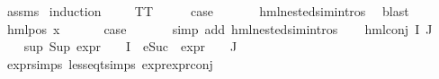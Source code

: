 \begin{isabellebody}
%
\isadelimproof
%
\endisadelimproof
%
\isatagproof
{}\isamarkupfalse%
\ assms\isanewline
{}\isamarkupfalse%
\ {\isacharparenleft}{\kern0pt}induction\ {\isasymphi}{\isacharparenright}{\kern0pt}\isanewline
\ \ \isamarkupfalse%
\ TT\isanewline
\ \ \isamarkupfalse%
\ \isamarkupfalse%
\ {\isacharquery}{\kern0pt}case\ \isanewline
\ \ \ \ \isamarkupfalse%
\ hml{\isacharunderscore}{\kern0pt}{}{\isacharunderscore}{\kern0pt}nested{\isacharunderscore}{\kern0pt}sim{\isachardot}{\kern0pt}intros{\isacharparenleft}{\kern0pt}{}{\isacharparenright}{\kern0pt}\ \isamarkupfalse%
\ blast\isanewline
{}\isamarkupfalse%
\isanewline
\ \ \isamarkupfalse%
\ {\isacharparenleft}{\kern0pt}hml{\isacharunderscore}{\kern0pt}pos\ x{}\ {\isasymphi}{\isacharparenright}{\kern0pt}\isanewline
\ \ \isamarkupfalse%
\ \isamarkupfalse%
\ {\isacharquery}{\kern0pt}case\ \isanewline
\ \ \ \ \isamarkupfalse%
\ {\isacharparenleft}{\kern0pt}simp\ add{\isacharcolon}{\kern0pt}\ hml{\isacharunderscore}{\kern0pt}{}{\isacharunderscore}{\kern0pt}nested{\isacharunderscore}{\kern0pt}sim{\isachardot}{\kern0pt}intros{\isacharparenleft}{\kern0pt}{}{\isacharparenright}{\kern0pt}{\isacharparenright}{\kern0pt}\isanewline
{}\isamarkupfalse%
\isanewline
\ \ \isamarkupfalse%
\ {\isacharparenleft}{\kern0pt}hml{\isacharunderscore}{\kern0pt}conj\ I\ J\ {\isasymPhi}{\isacharparenright}{\kern0pt}\isanewline
\ \ \isamarkupfalse%
\ sup{\isacharcolon}{\kern0pt}\ {\isachardoublequoteopen}{\isacharparenleft}{\kern0pt}Sup\ {\isacharparenleft}{\kern0pt}{\isacharparenleft}{\kern0pt}expr{\isacharunderscore}{\kern0pt}{}\ {\isasymcirc}\ {\isasymPhi}{\isacharparenright}{\kern0pt}\ {\isacharbackquote}{\kern0pt}\ I\ {\isasymunion}\ {\isacharparenleft}{\kern0pt}{\isacharparenleft}{\kern0pt}eSuc\ {\isasymcirc}\ expr{\isacharunderscore}{\kern0pt}{}\ {\isasymcirc}\ {\isasymPhi}{\isacharparenright}{\kern0pt}\ {\isacharbackquote}{\kern0pt}\ J{\isacharparenright}{\kern0pt}{\isacharparenright}{\kern0pt}{\isacharparenright}{\kern0pt}\ {\isasymle}\ {}{\isachardoublequoteclose}\isanewline
\ \ \ \ \isamarkupfalse%
\ expr{\isachardot}{\kern0pt}simps\ less{\isacharunderscore}{\kern0pt}eq{\isacharunderscore}{\kern0pt}t{\isachardot}{\kern0pt}simps\ expr{\isacharunderscore}{\kern0pt}{}{\isachardot}{\kern0pt}expr{\isacharunderscore}{\kern0pt}{}{\isacharunderscore}{\kern0pt}conj\isanewline

\end{isabellebody}

